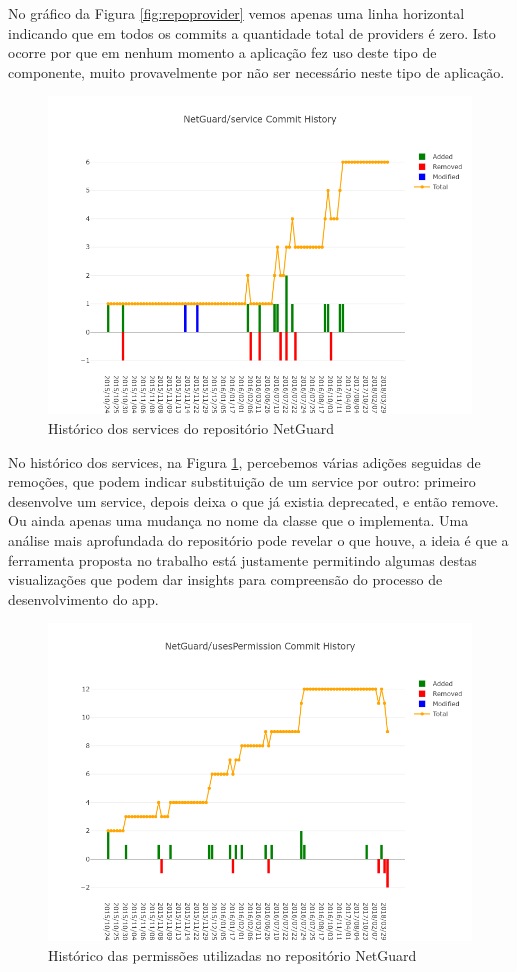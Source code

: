 \documentclass[a4paper,12pt]{article}
\begin{document}
{No gráfico da Figura \ref{fig:repoprovider} vemos apenas uma linha horizontal indicando que em todos os commits a quantidade total de providers é zero. Isto ocorre por que em nenhum momento a aplicação fez uso deste tipo de componente, muito provavelmente por não ser necessário neste tipo de aplicação.

\begin{figure}[H]
\centering
\includegraphics[width=\linewidth,height=0.5\linewidth]{imgs/NetGuard_service_history.png}
\caption{Histórico dos services do repositório NetGuard}
\label{fig:reposervice}
\end{figure}

No histórico dos services, na Figura \ref{fig:reposervice}, percebemos várias adições seguidas de remoções, que podem indicar substituição de um service por outro: primeiro desenvolve um service,  depois deixa o que já existia deprecated, e então remove. Ou ainda apenas uma mudança no nome da classe que o implementa. Uma análise mais aprofundada do repositório pode revelar o que houve, a ideia é que a ferramenta proposta no trabalho está justamente permitindo algumas destas visualizações que podem dar insights para compreensão do processo de desenvolvimento do app.

\begin{figure}[H]
\centering
\includegraphics[width=\linewidth,height=0.5\linewidth]{imgs/NetGuard_usesPermission_history.png}
\caption{Histórico das permissões utilizadas no repositório NetGuard}
\label{fig:repouses}
\end{figure}

}
\end{document}
